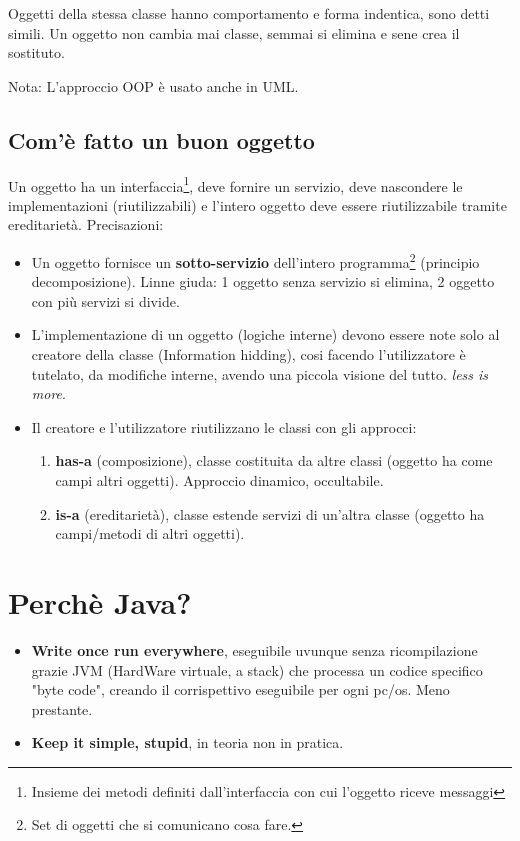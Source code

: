 Oggetti della stessa classe hanno comportamento e forma indentica, sono detti simili.
Un oggetto non cambia mai classe, semmai si elimina e sene crea il sostituto.

Nota: L'approccio OOP è usato anche in UML.

\subsection{Com'è fatto un buon oggetto}
Un oggetto ha un interfaccia\footnote{Insieme dei metodi definiti dall'interfaccia con cui l'oggetto riceve messaggi}, deve fornire un servizio, deve nascondere le implementazioni (riutilizzabili) e l'intero oggetto deve essere riutilizzabile tramite ereditarietà. Precisazioni:
\begin{itemize}
	\item Un oggetto fornisce un \textbf{sotto-servizio} dell'intero programma\footnote{Set di oggetti che si comunicano cosa fare.} (principio decomposizione). Linne giuda: 1 oggetto senza servizio si elimina, 2 oggetto con più servizi si divide.

	\item L'implementazione di un oggetto (logiche interne) devono essere note solo al creatore della classe (Information hidding), cosi facendo l'utilizzatore è tutelato, da modifiche interne, avendo una piccola visione del tutto. \textit{less is more}.

	\item Il creatore e l'utilizzatore riutilizzano le classi con gli approcci:
	\begin{enumerate}
		\item \textbf{has-a} (composizione), classe costituita da altre classi (oggetto ha come campi altri oggetti). Approccio dinamico, occultabile.
		\item \textbf{is-a} (ereditarietà), classe estende servizi di un'altra classe (oggetto ha campi/metodi di altri oggetti).
	\end{enumerate}
\end{itemize}

\section{Perchè Java?}
\begin{itemize}
	\item \textbf{Write once run everywhere}, eseguibile uvunque senza ricompilazione grazie JVM (HardWare virtuale, a stack) che processa un codice specifico "byte code", creando il corrispettivo eseguibile per ogni pc/os. Meno prestante.

	\item \textbf{Keep it simple, stupid}, in teoria non in pratica.
\end{itemize}